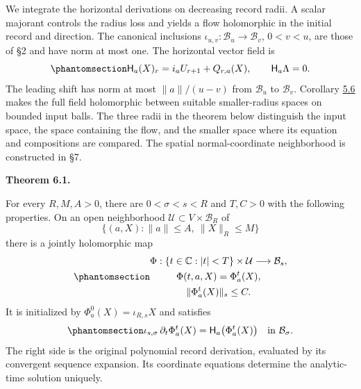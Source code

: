 \documentclass[
  english,
  11pt,
  reqno]{amsart}
\makeatletter
\newcommand{\pandocstatementheading}[1]{%
  \par\addpenalty{\@beginparpenalty}%
  \addvspace{.5\baselineskip plus .2\baselineskip minus .2\baselineskip}%
  {\normalfont\bfseries #1\par}%
  \nobreak\@afterindenttrue\@afterheading
}
\makeatother
\begin{document}
We integrate the horizontal derivations on decreasing record radii. A
scalar majorant controls the radius loss and yields a flow holomorphic
in the initial record and direction. The canonical inclusions
\(\iota_{u,v}:\mathcal B_u\to\mathcal B_v\), \(0<v<u\), are those of §2
and have norm at most one. The horizontal vector field is
\begin{equation}\protect\phantomsection\label{eq:es-horizontal-vector-field}{
 \mathsf H_a(X)_r=i_aU_{r+1}+Q_{r,a}(X),\qquad
 \mathsf H_a\Lambda=0.
}\end{equation} The leading shift has norm at most \(\|a\|/(u-v)\) from
\(\mathcal B_u\) to \(\mathcal B_v\). Corollary
\hyperref[cor:es-nonlinear-field]{5.6} makes the full field holomorphic
between suitable smaller-radius spaces on bounded input balls. The three
radii in the theorem below distinguish the input space, the space
containing the flow, and the smaller space where its equation and
compositions are compared. The spatial normal-coordinate neighborhood is
constructed in §7.

\pandocstatementheading{\protect{}\label{thm:es-flow}Theorem 6.1.}

For every \(R,M,A>0\), there are \(0<\sigma<s<R\) and \(T,C>0\) with the
following properties. On an open neighborhood
\(\mathcal U\subset V\times\mathcal B_R\) of \[
 \{(a,X):\|a\|\le A,\ \|X\|_R\le M\}
\] there is a jointly holomorphic map
\begin{equation}\protect\phantomsection\label{eq:es-flow-map}{\begin{gathered}
\Phi:\{t\in\mathbb C:|t|<T\}\times\mathcal U
                 \longrightarrow\mathcal B_s, \\
\Phi(t,a,X)=\Phi_a^t(X), \\
\|\Phi_a^t(X)\|_s\le C.
\end{gathered}}\end{equation} It is initialized by \(\Phi_a^0(X)=\iota_{R,s}X\) and
satisfies
\begin{equation}\protect\phantomsection\label{eq:es-flow-equation}{
 \iota_{s,\sigma}\,\partial_t\Phi_a^t(X)
       =\mathsf H_a\bigl(\Phi_a^t(X)\bigr)
       \quad\text{in }\mathcal B_\sigma.
}\end{equation} The right side is the original polynomial record
derivation, evaluated by its convergent sequence expansion. Its
coordinate equations determine the analytic-time solution uniquely.
\end{document}
